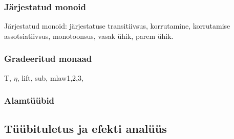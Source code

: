 \documentclass[a4paper,12pt]{article}
\begin{document}
\subsubsection{Järjestatud monoid}
Järjestatud monoid: järjestatuse transitiivsus, korrutamine, korrutamise assotsiatiivsus, monotoonsus, vasak ühik, parem ühik.

\subsubsection{Gradeeritud monaad}
T, $\eta$, lift, sub, mlaw1,2,3, 
\subsubsection{Alamtüübid}

\subsection{Tüübituletus ja efekti analüüs} \label{ssec:exc.inference}
\end{document}
